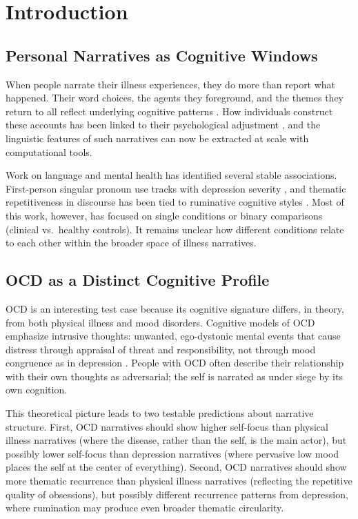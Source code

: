 \documentclass[11pt,a4paper]{article}
\begin{document}
\section{Introduction}

\subsection{Personal Narratives as Cognitive Windows}

When people narrate their illness experiences, they do more than report what happened. Their word choices, the agents they foreground, and the themes they return to all reflect underlying cognitive patterns \citep{pennebaker2011}. How individuals construct these accounts has been linked to their psychological adjustment \citep{frank1995}, and the linguistic features of such narratives can now be extracted at scale with computational tools.

Work on language and mental health has identified several stable associations. First-person singular pronoun use tracks with depression severity \citep{rude2004}, and thematic repetitiveness in discourse has been tied to ruminative cognitive styles \citep{nolenhoeksema2000}. Most of this work, however, has focused on single conditions or binary comparisons (clinical vs.\ healthy controls). It remains unclear how different conditions relate to each other within the broader space of illness narratives.

\subsection{OCD as a Distinct Cognitive Profile}

OCD is an interesting test case because its cognitive signature differs, in theory, from both physical illness and mood disorders. Cognitive models of OCD emphasize intrusive thoughts: unwanted, ego-dystonic mental events that cause distress through appraisal of threat and responsibility, not through mood congruence as in depression \citep{salkovskis1985,rachman1997}. People with OCD often describe their relationship with their own thoughts as adversarial; the self is narrated as under siege by its own cognition.

This theoretical picture leads to two testable predictions about narrative structure. First, OCD narratives should show higher self-focus than physical illness narratives (where the disease, rather than the self, is the main actor), but possibly lower self-focus than depression narratives (where pervasive low mood places the self at the center of everything). Second, OCD narratives should show more thematic recurrence than physical illness narratives (reflecting the repetitive quality of obsessions), but possibly different recurrence patterns from depression, where rumination may produce even broader thematic circularity.
\end{document}
